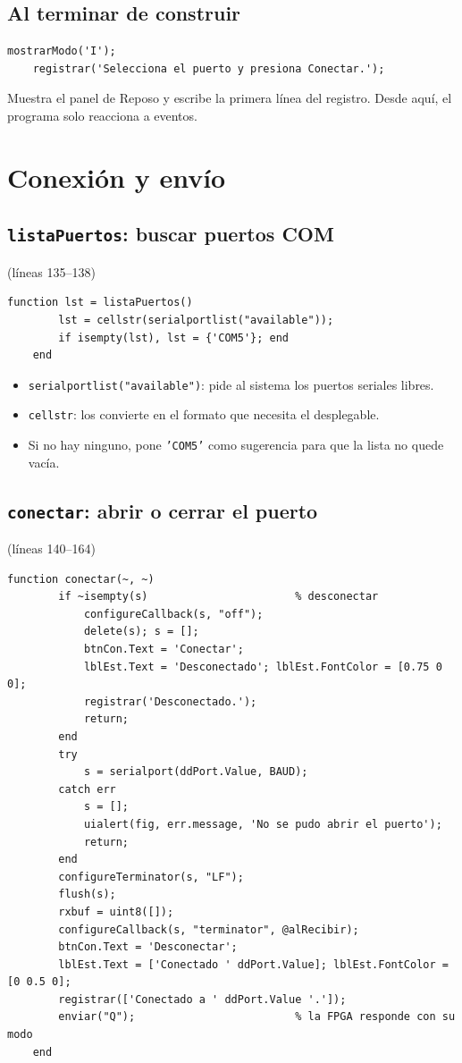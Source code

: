 \documentclass[11pt,a4paper]{article}
\newcommand{\linea}[1]{\textcolor{gris}{\small(líneas #1)}}
\newcommand{\cod}[1]{\texttt{#1}}
\begin{document}
\subsection{Al terminar de construir}
\begin{lstlisting}[firstnumber=128]
    mostrarModo('I');
    registrar('Selecciona el puerto y presiona Conectar.');
\end{lstlisting}
Muestra el panel de Reposo y escribe la primera línea del registro. Desde aquí,
el programa solo reacciona a eventos.

\section{Conexión y envío}

\subsection{\texttt{listaPuertos}: buscar puertos COM}
\linea{135--138}
\begin{lstlisting}[firstnumber=135]
    function lst = listaPuertos()
        lst = cellstr(serialportlist("available"));
        if isempty(lst), lst = {'COM5'}; end
    end
\end{lstlisting}
\begin{itemize}
  \item \cod{serialportlist("available")}: pide al sistema los puertos seriales libres.
  \item \cod{cellstr}: los convierte en el formato que necesita el desplegable.
  \item Si no hay ninguno, pone \cod{'COM5'} como sugerencia para que la lista no quede vacía.
\end{itemize}

\subsection{\texttt{conectar}: abrir o cerrar el puerto}
\linea{140--164}
\begin{lstlisting}[firstnumber=140]
    function conectar(~, ~)
        if ~isempty(s)                       % desconectar
            configureCallback(s, "off");
            delete(s); s = [];
            btnCon.Text = 'Conectar';
            lblEst.Text = 'Desconectado'; lblEst.FontColor = [0.75 0 0];
            registrar('Desconectado.');
            return;
        end
        try
            s = serialport(ddPort.Value, BAUD);
        catch err
            s = [];
            uialert(fig, err.message, 'No se pudo abrir el puerto');
            return;
        end
        configureTerminator(s, "LF");
        flush(s);
        rxbuf = uint8([]);
        configureCallback(s, "terminator", @alRecibir);
        btnCon.Text = 'Desconectar';
        lblEst.Text = ['Conectado ' ddPort.Value]; lblEst.FontColor = [0 0.5 0];
        registrar(['Conectado a ' ddPort.Value '.']);
        enviar("Q");                         % la FPGA responde con su modo
    end
\end{lstlisting}
\end{document}
